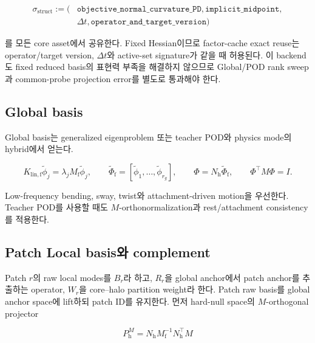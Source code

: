 \documentclass[11pt,a4paper]{article}
\begin{document}
\begin{equation}
\begin{aligned}
  \sigma_{\mathrm{struct}}:=\bigl(&
  \texttt{objective\_normal\_curvature\_PD},
  \texttt{implicit\_midpoint},\\
  &\Delta t,
  \texttt{operator\_and\_target\_version}\bigr)
  \label{eq:v0-structural-freeze-signature}
\end{aligned}
\end{equation}

를 모든 core asset에서 공유한다. Fixed Hessian이므로 factor-cache exact reuse는
operator/target version, \(\Delta t\)와 active-set signature가 같을 때 허용된다.
이 backend도 fixed reduced basis의 표현력 부족을 해결하지 않으므로
Global/POD rank sweep과 common-probe projection error를 별도로 통과해야 한다.

\subsection{Global basis}

Global basis는 generalized eigenproblem 또는 teacher POD와 physics mode의 hybrid에서 얻는다.

\begin{equation}
  K_{\mathrm{lin,f}}\widetilde\phi_j
  =\lambda_jM_{\mathrm f}\widetilde\phi_j,
  \qquad
  \widetilde\Phi_{\mathrm f}
  =[\widetilde\phi_1,\ldots,\widetilde\phi_{r_g}],
  \qquad
  \Phi=N_{\mathrm h}\widetilde\Phi_{\mathrm f},
  \qquad
  \Phi^\top M\Phi=I.
\end{equation}

Low-frequency bending, sway, twist와 attachment-driven motion을 우선한다.
Teacher POD를 사용할 때도 \(M\)-orthonormalization과 rest/attachment consistency를 적용한다.

\subsection{Patch Local basis와 complement}

Patch \(r\)의 raw local modes를 \(B_r\)라 하고,
\(R_r\)을 global anchor에서 patch anchor를 추출하는 operator,
\(W_r\)을 core--halo partition weight라 한다.
Patch raw basis를 global anchor space에 lift하되 patch ID를 유지한다.
먼저 hard-null space의 \(M\)-orthogonal projector

\begin{equation}
  P_{\mathrm h}^M
  =N_{\mathrm h}M_{\mathrm f}^{-1}N_{\mathrm h}^\top M
\end{equation}
\end{document}
